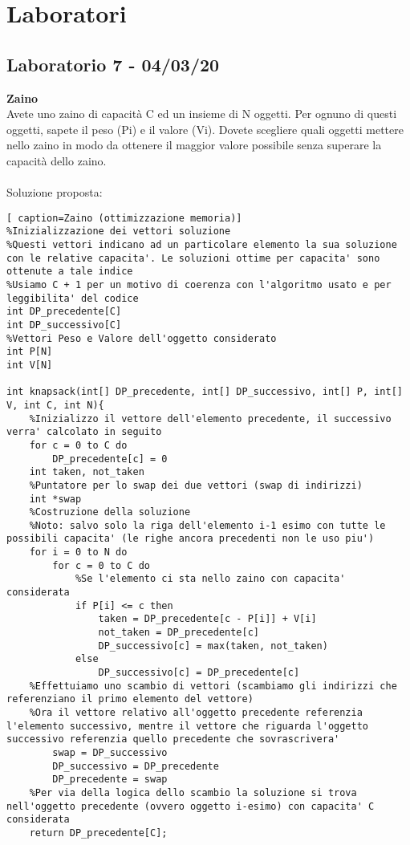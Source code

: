 \documentclass[../cheatSheetAlgoritmi.tex]{subfiles}
\begin{document}
\section{Laboratori}
\subsection{Laboratorio 7 - 04/03/20}
\textbf{Zaino}\\
Avete uno zaino di capacità C ed un insieme di N oggetti. Per ognuno di questi oggetti, sapete il peso (Pi) e il valore (Vi). Dovete scegliere quali oggetti mettere nello zaino in modo da ottenere il maggior valore possibile senza superare la capacità dello zaino.
\\\\
Soluzione proposta:
\begin{lstlisting}[ caption=Zaino (ottimizzazione memoria)]
%Inizializzazione dei vettori soluzione
%Questi vettori indicano ad un particolare elemento la sua soluzione con le relative capacita'. Le soluzioni ottime per capacita' sono ottenute a tale indice
%Usiamo C + 1 per un motivo di coerenza con l'algoritmo usato e per leggibilita' del codice
int DP_precedente[C]
int DP_successivo[C]
%Vettori Peso e Valore dell'oggetto considerato
int P[N]
int V[N]

int knapsack(int[] DP_precedente, int[] DP_successivo, int[] P, int[] V, int C, int N){
	%Inizializzo il vettore dell'elemento precedente, il successivo verra' calcolato in seguito
	for c = 0 to C do
		DP_precedente[c] = 0
	int taken, not_taken
	%Puntatore per lo swap dei due vettori (swap di indirizzi)
	int *swap
	%Costruzione della soluzione
	%Noto: salvo solo la riga dell'elemento i-1 esimo con tutte le possibili capacita' (le righe ancora precedenti non le uso piu')
	for i = 0 to N do
		for c = 0 to C do
			%Se l'elemento ci sta nello zaino con capacita' considerata
			if P[i] <= c then
				taken = DP_precedente[c - P[i]] + V[i]
				not_taken = DP_precedente[c]
				DP_successivo[c] = max(taken, not_taken)
			else
				DP_successivo[c] = DP_precedente[c]		
	%Effettuiamo uno scambio di vettori (scambiamo gli indirizzi che referenziano il primo elemento del vettore)
	%Ora il vettore relativo all'oggetto precedente referenzia l'elemento successivo, mentre il vettore che riguarda l'oggetto successivo referenzia quello precedente che sovrascrivera'
		swap = DP_successivo
		DP_successivo = DP_precedente
		DP_precedente = swap	
	%Per via della logica dello scambio la soluzione si trova nell'oggetto precedente (ovvero oggetto i-esimo) con capacita' C considerata
	return DP_precedente[C];
	
\end{lstlisting}
\end{document}
